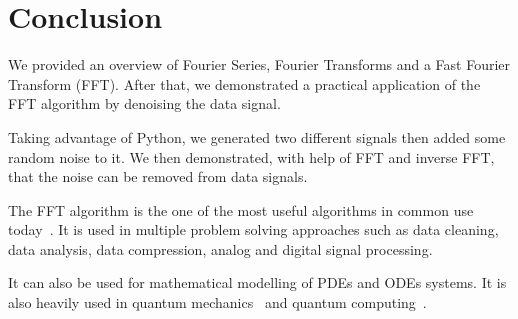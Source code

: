 \documentclass[a4paper, 12pt]{scrartcl}
\begin{document}
\section{Conclusion}
We provided an overview of Fourier Series, Fourier Transforms and a Fast Fourier Transform (FFT). 
After that, we demonstrated a practical application of the FFT algorithm by denoising the data signal.

Taking advantage of Python, we generated two different signals then added some random noise to it.
We then demonstrated, with help of FFT and inverse FFT, that the noise can be removed from data signals.

The FFT algorithm is the one of the most useful algorithms in common use today~\cite{fftalg}. 
It is used in multiple problem solving approaches such as data cleaning, data analysis, data compression, analog and digital signal processing.

It can also be used for mathematical modelling of PDEs and ODEs systems.
It is also heavily used in quantum mechanics~\cite{QCFFT} and quantum computing~\cite{QFT}.

\newpage


\end{document}
